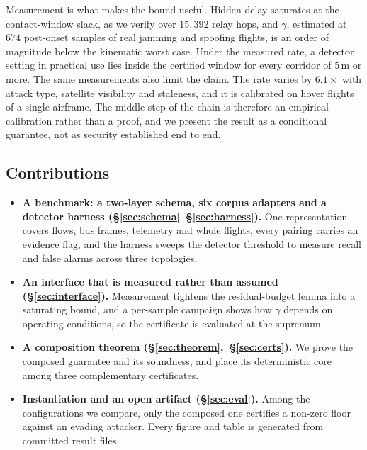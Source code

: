 \documentclass[conference,letterpaper,10pt]{IEEEtran}   %
\begin{document}
Measurement is what makes the bound useful. Hidden delay saturates at the
contact-window slack, as we verify over $15{,}392$ relay hops, and $\gamma$,
estimated at $674$ post-onset samples of real jamming and spoofing flights, is
an order of magnitude below the kinematic worst case. Under the measured rate, a
detector setting in practical use lies inside the certified window for every
corridor of $5$\,m or more. The same measurements also limit the claim. The rate
varies by $6.1\times$ with attack type, satellite visibility and staleness, and
it is calibrated on hover flights of a single airframe. The middle step of the
chain is therefore an empirical calibration rather than a proof, and we present
the result as a conditional guarantee, not as security established end to end.

\subsection*{Contributions}
\begin{itemize}
\item \textbf{A benchmark: a two-layer schema, six corpus adapters and a
detector harness (\S\ref{sec:schema}--\S\ref{sec:harness}).} One representation covers flows,
bus frames, telemetry and whole flights, every pairing carries an evidence
flag, and the harness sweeps the detector threshold to measure recall and false
alarms across three topologies.
\item \textbf{An interface that is measured rather than assumed
(\S\ref{sec:interface}).} Measurement tightens the residual-budget lemma into a
saturating bound, and a per-sample campaign shows how $\gamma$ depends on
operating conditions, so the certificate is evaluated at the supremum.
\item \textbf{A composition theorem (\S\ref{sec:theorem},~\S\ref{sec:certs}).}
We prove the composed guarantee and its soundness, and place its deterministic
core among three complementary certificates.
\item \textbf{Instantiation and an open artifact (\S\ref{sec:eval}).} Among the
configurations we compare, only the composed one certifies a non-zero floor
against an evading attacker. Every figure and table is generated from committed
result files.
\end{itemize}
\end{document}
